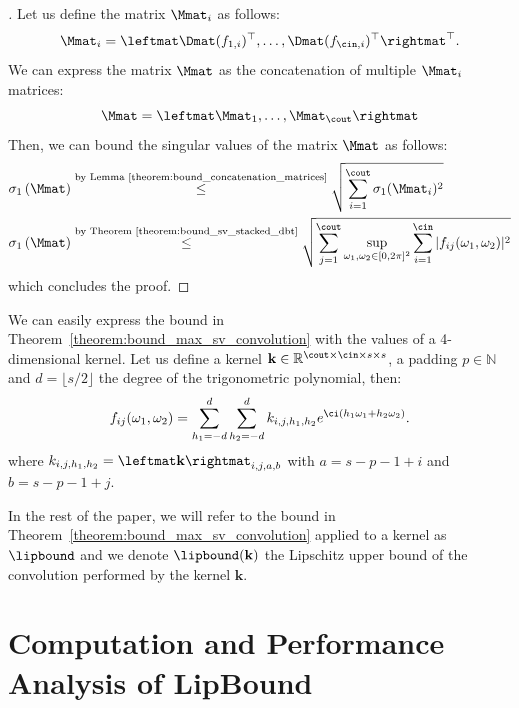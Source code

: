 \begin{proof}[]
Let us define the matrix $\Mmat_i$ as follows:
\begin{equation}
    \Mmat_i = \leftmat \Dmat(f_{1, i})^\top, \dots, \Dmat(f_{\cin, i})^\top \rightmat^\top .
\end{equation}
We can express the matrix $\Mmat$ as the concatenation of multiple $\Mmat_i$ matrices:
\begin{equation}
    \Mmat = \leftmat \Mmat_1, \dots, \Mmat_{\cout} \rightmat
\end{equation}
Then, we can bound the singular values of the matrix $\Mmat$ as follows:
\begin{align}
    \sigma_1\left(\Mmat\right) &\stackrel{\text{by Lemma~\ref{theorem:bound_concatenation_matrices}}}{\leq} \sqrt{\sum_{i=1}^{\cout} \sigma_1(\Mmat_i)^2} \\
    \sigma_1\left(\Mmat\right) &\stackrel{\text{by Theorem~\ref{theorem:bound_sv_stacked_dbt}}}{\leq} \sqrt{\sum_{j=1}^{\cout} \sup_{\omega_1, \omega_2 \in [0, 2\pi]^2} \sum_{i=1}^{\cin} |f_{ij}(\omega_1, \omega_2)|^2 }
\end{align}
which concludes the proof. 
\end{proof}



We can easily express the bound in Theorem~\ref{theorem:bound_max_sv_convolution} with the values of a 4-dimensional kernel.
Let us define a kernel $\mathbf{k} \in \mathbb{R}^{\cout \times \cin \times s \times s}$, a padding $p \in \mathbb{N}$ and $d = \lfloor s / 2 \rfloor$ the degree of the trigonometric polynomial, then:
\begin{equation}
  f_{ij}(\omega_1, \omega_2) = \sum_{h_1 = -d}^d \sum_{h_2 = -d}^d k_{i, j, h_1,h_2} e^{\ci (h_1 \omega_1 + h_2 \omega_2)}.
\end{equation}
where $k_{i, j, h_1,h_2} = \leftmat \mathbf{k} \rightmat_{i, j, a, b}$ with $a =  s - p - 1 + i$ and $b =  s - p - 1 + j$.

In the rest of the paper, we will refer to the bound in Theorem~\ref{theorem:bound_max_sv_convolution} applied to a kernel as $\lipbound$ and we denote $\lipbound(\mathbf{k})$ the Lipschitz upper bound of the convolution performed by the kernel $\mathbf{k}$. 


\section{Computation and Performance Analysis of LipBound}
\label{section:computation_performance_lipbound}


